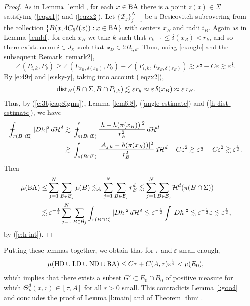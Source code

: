 \documentclass[11pt]{amsart}
\newcommand{\HH}{{\mathcal H}}
\newcommand{\dist}{{\rm dist}}
\newcommand{\rf}[1]{{(\ref{#1})}}
\newcommand{\ve}{{\varepsilon}}
\newcommand{\vv}{{\vspace{2mm}}}
\newcommand{\HD}{{\mathsf{HD}}}
\newcommand{\LD}{{\mathsf{LD}}}
\def\Xint#1{\mathchoice
{\XXint\displaystyle\textstyle{#1}}%
{\XXint\textstyle\scriptstyle{#1}}%
{\XXint\scriptstyle\scriptscriptstyle{#1}}%
{\XXint\scriptscriptstyle\scriptscriptstyle{#1}}%
\!\int}
\def\XXint#1#2#3{{\setbox0=\hbox{$#1{#2#3}{\int}$ }
\vcenter{\hbox{$#2#3$ }}\kern-.58\wd0}}
\def\avint{\Xint-}
\theoremstyle{definition}
\theoremstyle{remark}
\def\ND{{\rm ND}}
\def\LD{{\rm LD}}
\def\HD{{\rm HD}}
\def\BA{{\rm BA}}
\numberwithin{equation}{section}
\def\gec{\gtrsim}
\def\lec{\lesssim}
\def\lec{\lesssim}
\begin{document}
\begin{proof}
As in Lemma \ref{lemld}, for each $x\in\BA$ there is a point $z(x)\in\Sigma$
satisfying \rf{eqzx1} and \rf{eqzx2}.
Let $\{\mathcal{B}_j\}_{j=1}^{N}$ be a Besicovitch subcovering 
 from the collection $\{B(x,4C_5\delta(x)): x\in \BA\}$ with centers $x_B$ and radii $t_B$.
Again as in Lemma \ref{lemld}, for each $x_B$ we take $k$ such that $r_{k-1}\leq \delta(x_B) < r_{k}$, and so there exists
some $i\in J_k$ such that $x_B\in 2B_{i,k}$. Then, using  \eqref{e:angle} and the subsequent
Remark \ref{remark2},
	\begin{equation}\label{angle-estimate}
	\angle(P_{i,k},P_{0})\geq \angle(L_{x_B,\delta(x_B)},P_{0})-\angle(P_{i,k},L_{x_B,\delta(x_B)})
	\gec \ve^{\frac{1}{4}} - C \ve \gec \ve^{\frac{1}{4}}. 
	\end{equation}
	By \eqref{e:49r} and \eqref{e:sky-y}, taking into account \rf{eqzx2},
	\begin{equation}\label{h-dist-estimate}
	\dist_{H}(B \cap \Sigma, B\cap P_{i,k})\lec \ve r_{k}\approx \ve\, \delta(x_B)\approx \ve\,
	r_{B}.\end{equation}
	Thus, by \rf{e:3bjcapSigma}, Lemma \ref{lem6.8}, \rf{angle-estimate} and \rf{h-dist-estimate}, we have
	\begin{align*}
	\avint_{\pi(B\cap \Sigma)} |Dh|^{2} \,d\HH^d &\gec \;\avint_{\pi(B\cap \Sigma)} \frac{|h-h(\pi(x_B))|^{2}}{r_{B}^2} \,d\HH^d\\
	&\gec  \;\avint_{\pi(B\cap \Sigma)} \frac{|A_{j,k}-h(\pi(x_B))|^{2}}{r_{B}^2}\,d\HH^d - C \ve^2
	\gec \ve^{\frac12} -C\ve^2 \gec \ve^{\frac12}. 
	\end{align*}
	 Then
	\begin{align*}
	\mu(\BA)
	& \leq \sum_{j=1}^N\sum_{B\in\mathcal B_{j}}\mu(B)
	\lesssim_{A} \sum_{j=1}^N\sum_{B\in\mathcal B_{j}}r_{B}^{d} 
	\lec \sum_{j=1}^N\sum_{B\in\mathcal B_{j}} \HH^d(\pi(B\cap \Sigma))\\
	& \lec \ve^{-\frac12} \sum_{j=1}^N\sum_{B\in\mathcal B_{j}} \int_{\pi(B\cap \Sigma)} |Dh|^{2} \,d\HH^d
 	\lec \ve^{-\frac{1}{2}} \int |Dh|^{2} \lec \ve^{-\frac12}\ve\lec \ve^{\frac12},
	\end{align*}
	by \rf{e:h-int}.
\end{proof}
\vv

Putting these lemmas together, we obtain that for $\tau$ and $\ve$ small enough,
\[
\mu( \HD\cup\LD\cup \ND\cup \BA)\leq C\tau + C(A,\tau) \ve^{\frac{1}{4}}  <\mu(E_{0}),
\]
which implies that there exists a subset $G'\subset E_{0}\cap B_{0}$ of positive measure for which $\Theta^d_{\mu}(x,r) \in [\tau,A]$ for all $r>0$ small. 
This contradicts Lemma \ref{l:good} and concludes the proof of
Lemma \ref{l:main} and of Theorem \ref{thmi}.
\end{document}
